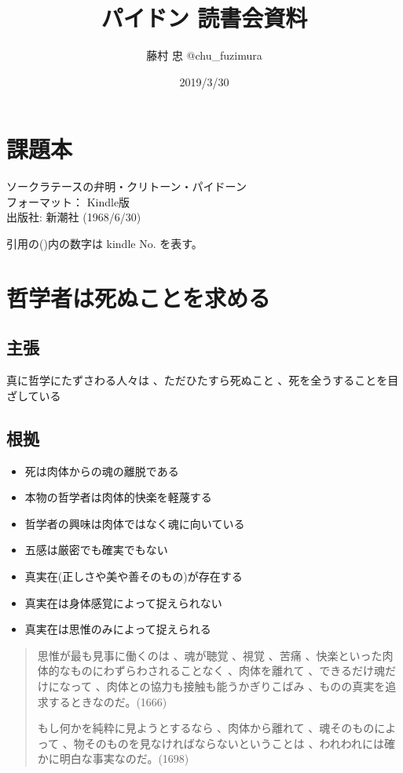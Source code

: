 \documentclass[a4j,11pt]{jarticle}
\author{藤村 忠 @chu\_fuzimura}
\title{パイドン 読書会資料}
\date{2019/3/30}
\begin{document}
\maketitle

\section{課題本}
ソークラテースの弁明・クリトーン・パイドーン \\
フォーマット： Kindle版  \\
出版社: 新潮社 (1968/6/30)  

引用の()内の数字は kindle No. を表す。

\section{哲学者は死ぬことを求める}

\subsection{主張}
真に哲学にたずさわる人々は 、ただひたすら死ぬこと 、死を全うすることを目ざしている

\subsection{根拠}

\begin{itemize}
    \item 死は肉体からの魂の離脱である
    \item 本物の哲学者は肉体的快楽を軽蔑する
    \item 哲学者の興味は肉体ではなく魂に向いている
    \item 五感は厳密でも確実でもない
    \item 真実在(正しさや美や善そのもの)が存在する
    \item 真実在は身体感覚によって捉えられない
    \item 真実在は思惟のみによって捉えられる
\end{itemize}

\begin{quotation}
    思惟が最も見事に働くのは 、魂が聴覚 、視覚 、苦痛 、快楽といった肉体的なものにわずらわされることなく 、肉体を離れて 、できるだけ魂だけになって 、肉体との協力も接触も能うかぎりこばみ 、ものの真実を追求するときなのだ。(1666)
    
    もし何かを純粋に見ようとするなら 、肉体から離れて 、魂そのものによって 、物そのものを見なければならないということは 、われわれには確かに明白な事実なのだ。(1698)
\end{quotation}
\end{document}
